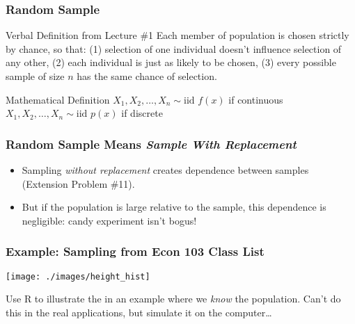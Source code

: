\begin{frame}
\frametitle{Random Sample}

\begin{block}{Verbal Definition from Lecture \#1}
Each member of population is chosen strictly by chance, so that: (1) selection of one individual doesn't influence selection of any other, (2) each individual is just as likely to be chosen, (3) every possible sample of size $n$ has the same chance of selection.
\end{block}

\begin{alertblock}{Mathematical Definition}
	$X_1, X_2, \hdots, X_n \sim \mbox{iid } f(x)$ if continuous\\
  $X_1, X_2, \hdots, X_n \sim \mbox{iid } p(x)$ if discrete
\end{alertblock}

\end{frame}

\begin{frame}
  \frametitle{Random Sample Means \emph{Sample With Replacement}}


\begin{itemize}
  \item Sampling \emph{without replacement} creates dependence between samples (Extension Problem \#11).
  \item But if the population is large relative to the sample, this dependence is negligible: candy experiment isn't bogus!
\end{itemize}
\end{frame}


\begin{frame}
\frametitle{Example: Sampling from Econ 103 Class List}
\begin{center}
\texttt{[image: ./images/height\_hist]}
\end{center}
\alert{Use R to illustrate the in an example where we \emph{know} the population.  
Can't do this in the real applications, but simulate it on the computer\dots}
\end{frame}

